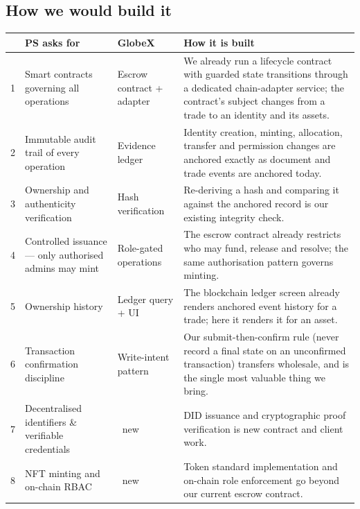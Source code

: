 \documentclass[11pt]{article}
\newcommand{\bld}{{\color{gxamber}\ding{53}}}       %
\begin{document}
\subsection*{How we would build it}
\renewcommand{\arraystretch}{1.35}
\noindent\begin{longtable}{@{}p{0.5cm}p{4.5cm}p{2.0cm}p{8.6cm}@{}}
\toprule
& \textbf{PS asks for} & \textbf{GlobeX} & \textbf{How it is built} \\
\midrule
\endhead
1 & Smart contracts governing all operations & Escrow contract + adapter & We already run a lifecycle contract with guarded state transitions through a dedicated chain-adapter service; the contract's subject changes from a trade to an identity and its assets. \\
2 & Immutable audit trail of every operation & Evidence ledger & Identity creation, minting, allocation, transfer and permission changes are anchored exactly as document and trade events are anchored today. \\
3 & Ownership and authenticity verification & Hash verification & Re-deriving a hash and comparing it against the anchored record is our existing integrity check. \\
4 & Controlled issuance --- only authorised admins may mint & Role-gated operations & The escrow contract already restricts who may fund, release and resolve; the same authorisation pattern governs minting. \\
5 & Ownership history & Ledger query + UI & The blockchain ledger screen already renders anchored event history for a trade; here it renders it for an asset. \\
6 & Transaction confirmation discipline & Write-intent pattern & Our submit-then-confirm rule (never record a final state on an unconfirmed transaction) transfers wholesale, and is the single most valuable thing we bring. \\
7 & Decentralised identifiers \& verifiable credentials & \bld\ new & DID issuance and cryptographic proof verification is new contract and client work. \\
8 & NFT minting and on-chain RBAC & \bld\ new & Token standard implementation and on-chain role enforcement go beyond our current escrow contract. \\
\bottomrule
\end{longtable}

\vspace{-0.4em}
\end{document}
